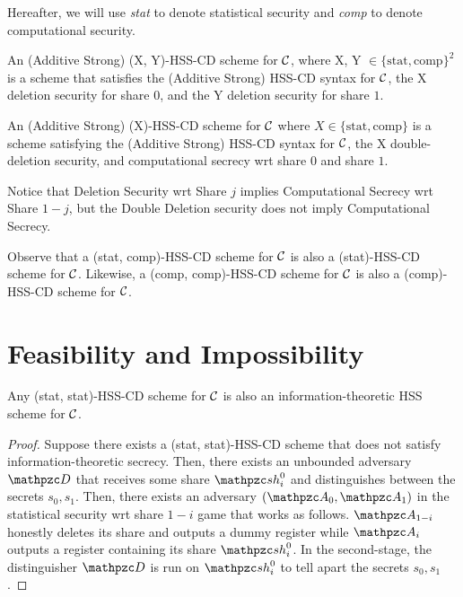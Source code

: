 Hereafter, we will use \emph{stat} to denote statistical
security and \emph{comp} to denote computational security.

\begin{definition}
An (Additive Strong) (X, Y)-HSS-CD scheme for $\mathcal{C}$, where X, Y
$\in
\{\textrm{stat},
\textrm{comp}\}^2$  is a scheme that satisfies the (Additive Strong)
HSS-CD
syntax for $\mathcal{C}$, the X deletion security for share $0$, and the
Y deletion security for share $1$.
\end{definition}

\begin{definition} An
(Additive Strong) (X)-HSS-CD scheme for $\mathcal{C}$ where $X \in
\{\textrm{stat}, \textrm{comp}\}$ is a scheme satisfying the
(Additive Strong) HSS-CD syntax for $\mathcal{C}$, the X double-deletion
security, and computational secrecy wrt share $0$ and share $1$.
\end{definition}

\begin{remark}
Notice that Deletion Security wrt Share
$j$ implies Computational Secrecy wrt Share $1-j$, but the Double
Deletion security does not imply Computational Secrecy.
\end{remark}

\begin{remark}
Observe that a (stat, comp)-HSS-CD scheme for $\mathcal{C}$ is also
a (stat)-HSS-CD scheme for $\mathcal{C}$. Likewise, a (comp,
comp)-HSS-CD scheme for $\mathcal{C}$ is also a (comp)-HSS-CD scheme for
$\mathcal{C}$.
\end{remark}

\section{Feasibility and Impossibility}

\begin{lemma}
Any (stat, stat)-HSS-CD scheme for $\cal{C}$ is also an
information-theoretic HSS scheme for $\mathcal{C}$.
\end{lemma}
\begin{proof}
Suppose there exists a (stat, stat)-HSS-CD scheme that does not
satisfy information-theoretic secrecy. Then, there exists an
unbounded adversary $\qD$ that receives some share $\qsh_i^0$ and
distinguishes between the secrets $s_0, s_1$. Then, there exists an
adversary $(\qA_0, \qA_1)$ in the statistical security wrt share
$1-i$ game that works as follows. $\qA_{1-i}$ honestly deletes its
share and outputs a dummy register while $\qA_i$ outputs a register
containing its share $\qsh_i^0$. In the second-stage, the
distinguisher $\qD$ is run on $\qsh_i^0$ to tell apart the secrets
$s_0, s_1$.
\end{proof}

